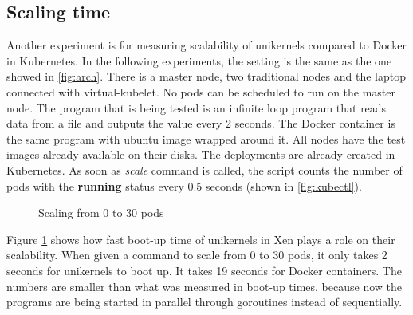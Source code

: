 \subsection{Scaling time}
Another experiment is for measuring scalability of unikernels compared to Docker in Kubernetes. In the following experiments, the setting is the same as the one showed in \ref{fig:arch}. There is a master node, two traditional nodes and the laptop connected with virtual-kubelet. No pods can be scheduled to run on the master node. The program that is being tested is an infinite loop program that reads data from a file and outputs the value every 2 seconds. The Docker container is the same program with ubuntu image wrapped around it. All nodes have the test images already available on their disks. The deployments are already created in Kubernetes. As soon as \textit{scale} command is called, the script counts the number of pods with the \textbf{running} status every 0.5 seconds (shown in \ref{fig:kubectl}).

\begin{figure}[htpb]
  \centering
  \caption{Scaling from 0 to 30 pods}\label{fig:scale-up-30}
  \end{figure}

Figure \ref{fig:scale-up-30} shows how fast boot-up time of unikernels in Xen plays a role on their scalability. When given a command to scale from 0 to 30 pods, it only takes 2 seconds for unikernels to boot up. It takes 19 seconds for Docker containers. The numbers are smaller than what was measured in boot-up times, because now the programs are being started in parallel through goroutines instead of sequentially.


